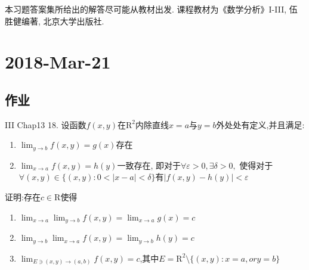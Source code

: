 \documentclass[a4paper,12pt]{article}
\author{龙子超}
\title{{\heiti {\zihao{3} 数学分析II-习题课}}}
\date{}
\begin{document}
\maketitle
%


本习题答案集所给出的解答尽可能从教材出发. 课程教材为《数学分析》I-III, 伍胜健编著,
北京大学出版社.
\section*{2018-Mar-21}
\subsection*{作业}
\noindent III Chap13 18. 设函数$f(x,y)$在$\mathrm{R}^2$内除直线$x=a$与$y=b$外处处有定义,并且满足:
   \begin{enumerate}
     \itemsep-0.5em 
     \item $\lim_{y\to b}f(x,y)=g(x)$存在
     \item $\lim_{x\to a}f(x,y)=h(y)$一致存在, 即对于$\forall \varepsilon>0,\exists\delta>0,$
       使得对于$\forall (x,y)\in\{(x,y):0<|x-a|<\delta\}$有$|f(x,y)-h(y)|<\varepsilon$
   \end{enumerate}
   证明:存在$c\in\mathrm{R}$使得
   \begin{enumerate}
     \itemsep-0.5em 
     \item $\lim_{x\to a}\lim_{y\to b}f(x,y)=\lim_{x\to a}g(x)=c$
     \item $\lim_{y\to b}\lim_{x\to a}f(x,y)=\lim_{y\to b}h(y)=c$
     \item $\lim_{E\owns(x,y)\to(a,b)}f(x,y)=c$,其中$E=\mathrm{R}^2\setminus\{(x,y):x=a,or y=b\}$
   \end{enumerate}
\end{document}
